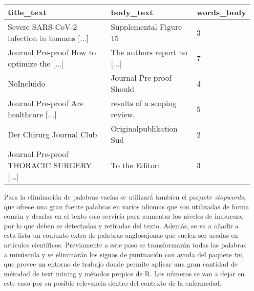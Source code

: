 \documentclass[10pt, a4paper]{article}
\begin{document}
\begin{tabular}{lll}
 title\_text & body\_text & words\_body\\
\hline
	 Severe SARS-CoV-2 infection in humans [...]      &  Supplemental Figure 15                       & 3\\
	 Journal Pre-proof How to optimize the [...]      &  The authors report no [...]                  & 7\\
	 NoIncluido                                       &  Journal Pre-proof Should                     & 4\\
	 Journal Pre-proof Are healthcare [...]           &  results of a scoping review.                 & 5\\
	 Der Chirurg Journal Club                         &  Originalpublikation Sud                      & 2\\
	 Journal Pre-proof THORACIC SURGERY [...]         &  To the Editor:                               & 3\\
\end{tabular}



Para la eliminación de palabras vacías se utilizará tambíen el paquete \textit{stopwords}, que ofrece una gran fuente palabras en varios idiomas que son utilizadas de forma común y dearlas en el texto solo serviría para aumentar los niveles de impureza, por lo que deben se detectadas y retiradas del texto. Además, se va a añadir a esta lista un conjunto extra de palabras anglosajonas que suelen ser usadas en artículos científicos. Previamente a este paso se transformarán todas las palabras a minúscula y se eliminarán los signos de puntuación con ayuda del paquete \textit{tm}, que provee un entorno de trabajo donde permite aplicar una gran cantidad de métodod de text mining y métodos propios de R. Los números se van a dejar en este caso por su posible relevancia dentro del contexto de la enfermedad. 
\end{document}
